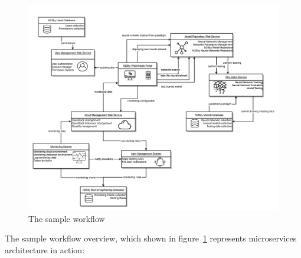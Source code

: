 \documentclass[10pt, conference, compsocconf]{IEEEtran}
\begin{document}
\begin{figure}[H]
  \includegraphics[width=\linewidth]{img/new_arch.png}
  \caption{The sample workflow}
  \label{fig:newarch}
\end{figure}



The sample workflow overview, which shown in figure~\ref{fig:newarch} represents microservices architecture in action:
\end{document}
